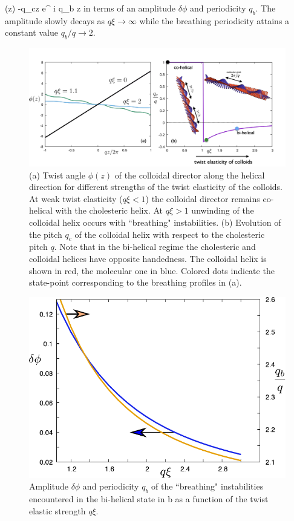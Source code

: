 \beq
\phi(z) -q_{c}z \approx   \delta \phi e^{  i q_{b} z }
\label{nlinrip}
\eeq
in terms of an amplitude $\delta \phi$ and periodicity $q_{b}$. The amplitude slowly decays as $q \xi \rightarrow \infty $ while the breathing periodicity attains a constant value $q_{b}/q \rightarrow 2$.


   \begin{figure}
	\includegraphics[width =  \columnwidth]{figures/chapter-4/bihelical}
	\caption[Evolution of the pitch $q_{c}$ of the colloidal helix with respect to the cholesteric pitch $q$]{ (a) Twist angle $\phi(z)$ of the colloidal director along the helical direction for different strengths of the twist elasticity of the colloids. At weak twist elasticity  ($q \xi <1$) the colloidal director remains co-helical with the cholesteric helix.  At $q \xi >1$ unwinding of the colloidal helix occurs with  ``breathing" instabilities.   (b) Evolution of the pitch $q_{c}$ of the colloidal helix with respect to the cholesteric pitch $q$. Note that in the bi-helical regime the cholesteric and colloidal helices have opposite handedness. The colloidal helix is shown in red, the molecular one in blue.   Colored dots indicate the  state-point corresponding to the breathing profiles in (a). }
	\label{unwind}
\end{figure}


 \begin{figure}
	\includegraphics[width = .6\columnwidth]{figures/chapter-4/fluctuations}
	\caption{ Amplitude $\delta \phi$ and periodicity $q_{b}$ of the ``breathing" instabilities encountered in the bi-helical state in b as a function of the twist elastic strength $q \xi$. }
	\label{fluc}
\end{figure}

